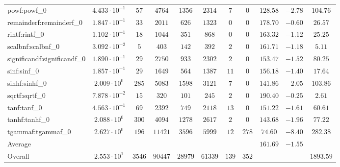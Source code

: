 \begin{tabular}{|l|c|c|c|c|c|c|c|c|c|c|}
powf:powf\_0                 & $ 4.433 \cdot 10^{-1} $ & $ 57     $ & $ 4764  $ & $ 1356  $ & $ 2314  $ & $ 7   $ & $ 0   $ & $ 128.58      $ & $ -2.78   $ & $ 104.76  $ \\
remainderf:remainderf\_0     & $ 1.847 \cdot 10^{-1} $ & $ 33     $ & $ 2011  $ & $ 626   $ & $ 1323  $ & $ 0   $ & $ 0   $ & $ 178.70      $ & $ -0.60   $ & $ 26.57   $ \\
rintf:rintf\_0               & $ 1.102 \cdot 10^{-1} $ & $ 18     $ & $ 1044  $ & $ 351   $ & $ 868   $ & $ 0   $ & $ 0   $ & $ 163.32      $ & $ -1.12   $ & $ 25.25   $ \\
scalbnf:scalbnf\_0           & $ 3.092 \cdot 10^{-2} $ & $ 5      $ & $ 403   $ & $ 142   $ & $ 392   $ & $ 2   $ & $ 0   $ & $ 161.71      $ & $ -1.18   $ & $ 5.11    $ \\
significandf:significandf\_0 & $ 1.890 \cdot 10^{-1} $ & $ 29     $ & $ 2750  $ & $ 933   $ & $ 2302  $ & $ 2   $ & $ 0   $ & $ 153.47      $ & $ -1.52   $ & $ 80.25   $ \\
sinf:sinf\_0                 & $ 1.857 \cdot 10^{-1} $ & $ 29     $ & $ 1649  $ & $ 564   $ & $ 1387  $ & $ 11  $ & $ 0   $ & $ 156.18      $ & $ -1.40   $ & $ 17.64   $ \\
sinhf:sinhf\_0               & $ 2.009 \cdot 10^{0}  $ & $ 285    $ & $ 5083  $ & $ 1598  $ & $ 3121  $ & $ 7   $ & $ 0   $ & $ 141.86      $ & $ -2.05   $ & $ 103.86  $ \\
sqrtf:sqrtf\_0               & $ 7.878 \cdot 10^{-2} $ & $ 15     $ & $ 320   $ & $ 101   $ & $ 245   $ & $ 2   $ & $ 0   $ & $ 190.40      $ & $ -0.25   $ & $ 2.61    $ \\
tanf:tanf\_0                 & $ 4.563 \cdot 10^{-1} $ & $ 69     $ & $ 2392  $ & $ 749   $ & $ 2118  $ & $ 13  $ & $ 0   $ & $ 151.22      $ & $ -1.61   $ & $ 60.61   $ \\
tanhf:tanhf\_0               & $ 2.088 \cdot 10^{0}  $ & $ 300    $ & $ 4094  $ & $ 1278  $ & $ 2617  $ & $ 2   $ & $ 0   $ & $ 143.68      $ & $ -1.96   $ & $ 77.22   $ \\
tgammaf:tgammaf\_0           & $ 2.627 \cdot 10^{0}  $ & $ 196    $ & $ 11421 $ & $ 3596  $ & $ 5999  $ & $ 12  $ & $ 278 $ & $ 74.60       $ & $ -8.40   $ & $ 282.38  $ \\
\hline
Average                      & $                     $ & $        $ & $       $ & $       $ & $       $ & $     $ & $     $ & $ 161.69      $ & $ -1.55   $ & $         $ \\
\hline
Overall                      & $ 2.553 \cdot 10^{1}  $ & $ 3546   $ & $ 90447 $ & $ 28979 $ & $ 61339 $ & $ 139 $ & $ 352 $ & $             $ & $         $ & $ 1893.59 $ \\
\hline
\end{tabular}
